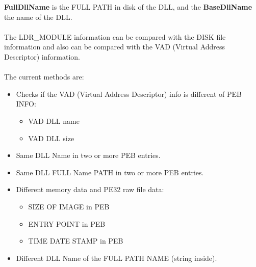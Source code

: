 \documentclass[12pt,a4paper,english]{book}
\newcommand{\keyword}[1]{\index{#1}#1}
\newcommand{\paraph}{\paragraph{}}
\begin{document}
{\bf FullDllName} is the FULL PATH in disk of the DLL, and the {\bf BaseDllName} the name of the DLL. 

\paraph{}
The LDR\_MODULE information can be compared with the DISK file information and also can be compared with the VAD (Virtual Address Descriptor) information.

\paraph{}
The current methods are:

\begin{itemize}
\item { Checks if the VAD (Virtual Address Descriptor) info is different of PEB INFO: 
\begin{itemize}
\item { VAD DLL name }
\item { VAD DLL size }
\end{itemize}
}
\item { Same DLL Name in two or more PEB entries. }
\item { Same DLL FULL Name PATH in two or more PEB entries. }
\item { Different memory data and PE32 raw file data:
\begin{itemize}
\item { SIZE OF IMAGE in PEB }
\item { ENTRY POINT in PEB }
\item { TIME DATE STAMP in PEB }
\end{itemize}
} 
\item { Different DLL Name of the FULL PATH NAME (string inside). }
\end{itemize}




\fancyhead[LE,RO]{}
\printbibliography[heading=bibintoc]

\clearpage
{}
\printindex
\end{document}
